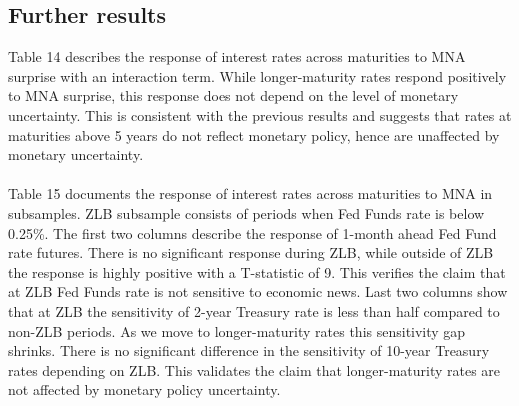 \documentclass[12pt]{article}
\begin{document}
\subsection{Further results} 
\label{sec:Model}

Table 14 describes the response of interest rates across maturities to MNA surprise with an interaction term. While longer-maturity rates respond positively to MNA surprise, this response does not depend on the level of monetary uncertainty. This is consistent with the previous results and suggests that rates at maturities above 5 years do not reflect monetary policy, hence are unaffected by monetary uncertainty.
\paragraph{}
Table 15 documents the response of interest rates across maturities to MNA in subsamples. ZLB subsample consists of periods when Fed Funds rate is below 0.25\%. The first two columns describe the response of 1-month ahead Fed Fund rate futures. There is no significant response during ZLB, while outside of ZLB the response is highly positive with a T-statistic of 9. This verifies the claim that at ZLB Fed Funds rate is not sensitive to economic news. Last two columns show that at ZLB the sensitivity of 2-year Treasury rate is less than half compared to non-ZLB periods. As we move to longer-maturity rates this sensitivity gap shrinks. There is no significant difference in the sensitivity of 10-year Treasury rates depending on ZLB. This validates the claim that longer-maturity rates are not affected by monetary policy uncertainty.
\end{document}
